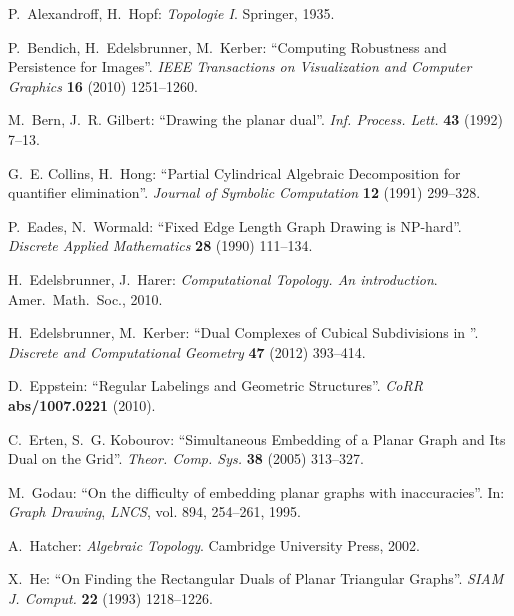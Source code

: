 \documentclass[12pt]{article}
\begin{document}
\begin{thebibliography}{10}
\newcommand{\enquote}[1]{``#1''}
\providecommand{\url}[1]{\texttt{#1}}
\providecommand{\urlprefix}{URL }

P.~Alexandroff, H.~Hopf: \emph{Topologie I}.
\newblock Springer, 1935.

P.~Bendich, H.~Edelsbrunner, M.~Kerber: \enquote{Computing Robustness and
  Persistence for Images}.
\newblock \emph{IEEE Transactions on Visualization and Computer Graphics}
  \textbf{16} (2010) 1251--1260.

M.~Bern, J.~R. Gilbert: \enquote{Drawing the planar dual}.
\newblock \emph{Inf. Process. Lett.} \textbf{43} (1992) 7--13.

G.~E. Collins, H.~Hong: \enquote{Partial Cylindrical Algebraic Decomposition
  for quantifier elimination}.
\newblock \emph{Journal of Symbolic Computation} \textbf{12} (1991) 299--328.

P.~Eades, N.~Wormald: \enquote{Fixed Edge Length Graph Drawing is NP-hard}.
\newblock \emph{Discrete Applied Mathematics} \textbf{28} (1990) 111--134.

H.~Edelsbrunner, J.~Harer: \emph{Computational Topology. An introduction}.
\newblock Amer.\ Math.\ Soc., 2010.

H.~Edelsbrunner, M.~Kerber: \enquote{Dual Complexes of Cubical Subdivisions in
  }.
\newblock \emph{Discrete and Computational Geometry} \textbf{47} (2012)
  393--414.

D.~Eppstein: \enquote{Regular Labelings and Geometric Structures}.
\newblock \emph{CoRR} \textbf{abs/1007.0221} (2010).

C.~Erten, S.~G. Kobourov: \enquote{Simultaneous Embedding of a Planar Graph and
  Its Dual on the Grid}.
\newblock \emph{Theor. Comp. Sys.} \textbf{38} (2005) 313--327.

M.~Godau: \enquote{On the difficulty of embedding planar graphs with
  inaccuracies}.
\newblock In: \emph{Graph Drawing}, \emph{LNCS}, vol. 894, 254--261, 1995.

A.~Hatcher: \emph{Algebraic Topology}.
\newblock Cambridge University Press, 2002.

X.~He: \enquote{On Finding the Rectangular Duals of Planar Triangular Graphs}.
\newblock \emph{SIAM J. Comput.} \textbf{22} (1993) 1218--1226.


\end{thebibliography}
\end{document}
